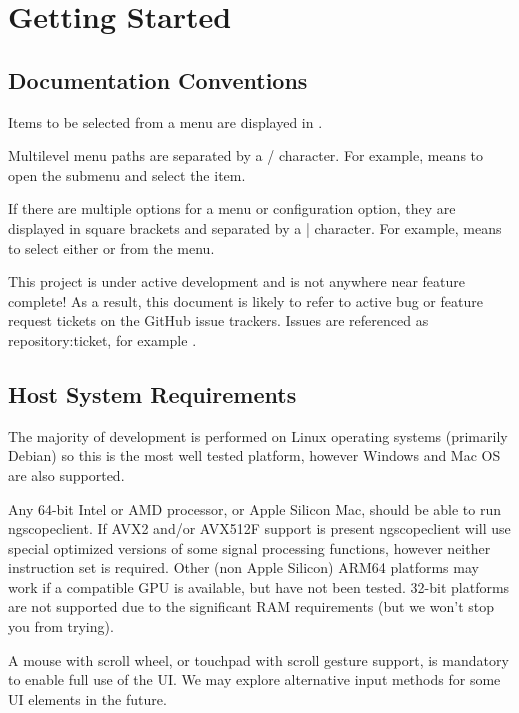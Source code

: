 \chapter{Getting Started}

\section{Documentation Conventions}

Items to be selected from a menu are displayed in .

Multilevel menu paths are separated by a / character. For example,  means to open the
 submenu and select the  item.

If there are multiple options for a menu or configuration option, they are displayed in square brackets and separated
by a | character. For example,  means to select either
 or  from the 
menu.

This project is under active development and is not anywhere near feature complete! As a result, this document is
likely to refer to active bug or feature request tickets on the GitHub issue trackers. Issues are referenced as
repository:ticket, for example .

\section{Host System Requirements}

The majority of development is performed on Linux operating systems (primarily Debian) so this is the most well
tested platform, however Windows and Mac OS are also supported.

Any 64-bit Intel or AMD processor, or Apple Silicon Mac, should be able to run ngscopeclient. If AVX2 and/or AVX512F
support is present ngscopeclient will use special optimized versions of some signal processing functions, however
neither instruction set is required. Other (non Apple Silicon) ARM64 platforms may work if a compatible GPU is
available, but have not been tested. 32-bit platforms are not supported due to the significant RAM requirements
(but we won't stop you from trying).

A mouse with scroll wheel, or touchpad with scroll gesture support, is mandatory to enable full use of the UI. We may
explore alternative input methods for some UI elements in the future.

